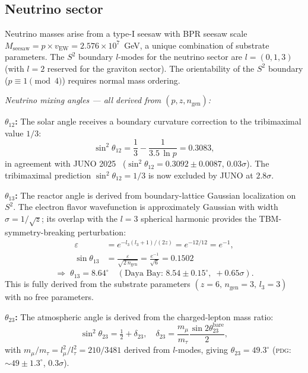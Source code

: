 \documentclass[aps,prd,twocolumn,superscriptaddress,longbibliography,nofootinbib]{revtex4-2}
\newcommand{\Stwo}{S^2}
\newcommand{\vEW}{v_{\mathrm{EW}}}
\begin{document}
\subsection{Neutrino sector}
\label{sec:neutrino}

Neutrino masses arise from a type-I seesaw with BPR seesaw scale
$M_{\mathrm{seesaw}} = p \times \vEW = 2.576 \times 10^7$~GeV, a
unique combination of substrate parameters.
The $\Stwo$ boundary $l$-modes for the neutrino sector are
$l = (0, 1, 3)$ (with $l = 2$ reserved for the graviton sector).
The orientability of the $\Stwo$ boundary ($p \equiv 1 \pmod{4}$) requires
normal mass ordering.

\textit{Neutrino mixing angles --- all derived from $(p, z, n_{\mathrm{gen}})$:}

\textbf{$\theta_{12}$:} The solar angle receives a boundary curvature
correction to the tribimaximal value $1/3$:
\begin{equation}
\sin^2\theta_{12} = \frac{1}{3} - \frac{1}{3.5\,\ln p} = 0.3083,
\label{eq:theta12}
\end{equation}
in agreement with JUNO 2025~\cite{JUNO2025}
($\sin^2\theta_{12} = 0.3092 \pm 0.0087$, $0.03\sigma$).
The tribimaximal prediction $\sin^2\theta_{12} = 1/3$ is now excluded
by JUNO at $2.8\sigma$.

\textbf{$\theta_{13}$:} The reactor angle is derived from boundary-lattice
Gaussian localization on $\Stwo$.  The electron flavor wavefunction is
approximately Gaussian with width $\sigma = 1/\!\sqrt{z}$; its overlap
with the $l = 3$ spherical harmonic provides the TBM-symmetry-breaking
perturbation:
\begin{align}
\varepsilon &= e^{-l_3(l_3+1)/(2z)}
             = e^{-12/12} = e^{-1}, \\
\sin\theta_{13} &= \frac{\varepsilon}{\sqrt{2\,n_{\mathrm{gen}}}}
                 = \frac{e^{-1}}{\sqrt{6}} = 0.1502
\label{eq:theta13}
\end{align}
\begin{equation}
\Longrightarrow\; \theta_{13} = 8.64^\circ
\quad (\text{Daya Bay: }8.54 \pm 0.15^\circ,\; +0.65\sigma).
\end{equation}
This is fully derived from the substrate parameters $(z = 6,\,
n_{\mathrm{gen}} = 3,\, l_3 = 3)$ with no free parameters.

\textbf{$\theta_{23}$:} The atmospheric angle is derived from the
charged-lepton mass ratio:
\begin{equation}
\sin^2\theta_{23} = \tfrac{1}{2} + \delta_{23},
\quad \delta_{23} = \frac{m_\mu}{m_\tau}\frac{\sin 2\theta_{23}^{\mathrm{bare}}}{2},
\end{equation}
with $m_\mu/m_\tau = l_\mu^2/l_\tau^2 = 210/3481$ derived from $l$-modes,
giving $\theta_{23} = 49.3^\circ$ (\textsc{pdg}: $\sim49 \pm 1.3^\circ$,
$0.3\sigma$).
\end{document}
